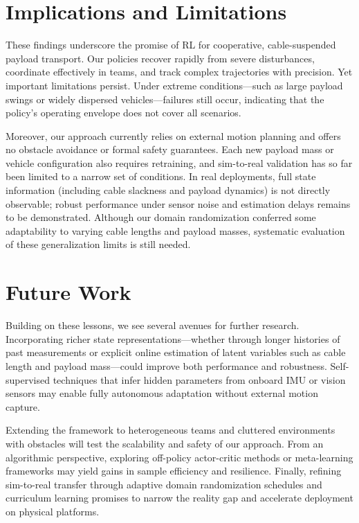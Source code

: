 \section{Implications and Limitations}

These findings underscore the promise of RL for cooperative, cable-suspended payload transport.  Our policies recover rapidly from severe disturbances, coordinate effectively in teams, and track complex trajectories with precision.  Yet important limitations persist.  Under extreme conditions—such as large payload swings or widely dispersed vehicles—failures still occur, indicating that the policy's operating envelope does not cover all scenarios.

Moreover, our approach currently relies on external motion planning and offers no obstacle avoidance or formal safety guarantees.  Each new payload mass or vehicle configuration also requires retraining, and sim-to-real validation has so far been limited to a narrow set of conditions.  In real deployments, full state information (including cable slackness and payload dynamics) is not directly observable; robust performance under sensor noise and estimation delays remains to be demonstrated.  Although our domain randomization conferred some adaptability to varying cable lengths and payload masses, systematic evaluation of these generalization limits is still needed.

\section{Future Work}

Building on these lessons, we see several avenues for further research.  Incorporating richer state representations—whether through longer histories of past measurements or explicit online estimation of latent variables such as cable length and payload mass—could improve both performance and robustness.  Self-supervised techniques that infer hidden parameters from onboard IMU or vision sensors may enable fully autonomous adaptation without external motion capture.

Extending the framework to heterogeneous teams and cluttered environments with obstacles will test the scalability and safety of our approach.  From an algorithmic perspective, exploring off-policy actor-critic methods or meta-learning frameworks may yield gains in sample efficiency and resilience.  Finally, refining sim-to-real transfer through adaptive domain randomization schedules and curriculum learning promises to narrow the reality gap and accelerate deployment on physical platforms.


